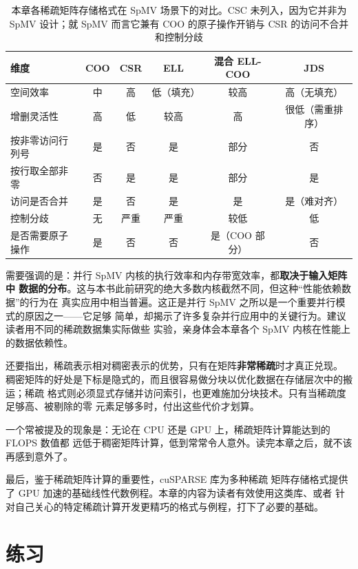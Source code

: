 \begin{table}[htbp]
  \centering
  \small
  \setlength{\tabcolsep}{4pt}
  \renewcommand{\arraystretch}{1.25}
  \begin{tabular}{l|c|c|c|c|c}
    \hline
    维度 & COO & CSR & ELL & 混合 ELL-COO & JDS\\
    \hline
    空间效率 & 中 & 高 & 低（填充） & 较高 & 高（无填充）\\
    增删灵活性 & 高 & 低 & 较高 & 高 & 很低（需重排序）\\
    按非零访问行列号 & 是 & 否 & 是 & 部分 & 否\\
    按行取全部非零 & 否 & 是 & 是 & 部分 & 是\\
    访问是否合并 & 是 & 否 & 是 & 是 & 是（难对齐）\\
    控制分歧 & 无 & 严重 & 严重 & 较低 & 低\\
    是否需要原子操作 & 是 & 否 & 否 & 是（COO 部分） & 否\\
    \hline
  \end{tabular}
  \caption{本章各稀疏矩阵存储格式在 SpMV 场景下的对比。CSC 未列入，因为它并非为
  SpMV 设计；就 SpMV 而言它兼有 COO 的原子操作开销与 CSR 的访问不合并和控制分歧}
  \label{tab:17-1}
\end{table}

需要强调的是：并行 SpMV 内核的执行效率和内存带宽效率，都\textbf{取决于输入矩阵中
数据的分布}。这与本书此前研究的绝大多数内核截然不同，但这种“性能依赖数据”的行为在
真实应用中相当普遍。这正是并行 SpMV 之所以是一个重要并行模式的原因之一——它足够
简单，却揭示了许多复杂并行应用中的关键行为。建议读者用不同的稀疏数据集实际做些
实验\cite{bell2009spmv}，亲身体会本章各个 SpMV 内核在性能上的数据依赖性。

还要指出，稀疏表示相对稠密表示的优势，只有在矩阵\textbf{非常稀疏}时才真正兑现。
稠密矩阵的好处是下标是隐式的，而且很容易做分块以优化数据在存储层次中的搬运；稀疏
格式则必须显式存储并访问索引，也更难施加分块技术。只有当稀疏度足够高、被剔除的零
元素足够多时，付出这些代价才划算。

一个常被提及的现象是：无论在 CPU 还是 GPU 上，稀疏矩阵计算能达到的 FLOPS 数值都
远低于稠密矩阵计算，低到常常令人意外。读完本章之后，就不该再感到意外了。

最后，鉴于稀疏矩阵计算的重要性，cuSPARSE 库\cite{nvidia-cusparse2025}为多种稀疏
矩阵存储格式提供了 GPU 加速的基础线性代数例程。本章的内容为读者有效使用这类库、或者
针对自己关心的特定稀疏计算开发更精巧的格式与例程，打下了必要的基础。

\section*{练习}

